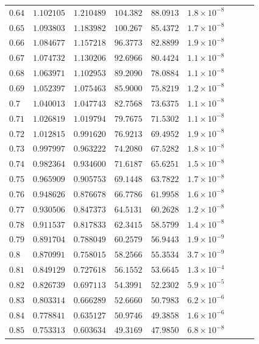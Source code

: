 \documentclass[12pt]{extarticle}
\theoremstyle{plain}
\theoremstyle{remark}
\begin{document}
\begin{longtable}{lcccccccc}
$0.64$ & $1.102105$ & $1.210489$ & $104.382$ & $88.0913$ & $1.8\times10^{-8}$ \\
$0.65$ & $1.093803$ & $1.183982$ & $100.267$ & $85.4372$ & $1.7\times10^{-8}$ \\
$0.66$ & $1.084677$ & $1.157218$ & $96.3773$ & $82.8899$ & $1.9\times10^{-8}$ \\
$0.67$ & $1.074732$ & $1.130206$ & $92.6966$ & $80.4424$ & $1.1\times10^{-8}$ \\
$0.68$ & $1.063971$ & $1.102953$ & $89.2090$ & $78.0884$ & $1.1\times10^{-8}$ \\
$0.69$ & $1.052397$ & $1.075463$ & $85.9000$ & $75.8219$ & $1.2\times10^{-8}$ \\
$0.7$ & $1.040013$ & $1.047743$ & $82.7568$ & $73.6375$ & $1.1\times10^{-8}$ \\
$0.71$ & $1.026819$ & $1.019794$ & $79.7675$ & $71.5302$ & $1.1\times10^{-8}$ \\
$0.72$ & $1.012815$ & $0.991620$ & $76.9213$ & $69.4952$ & $1.9\times10^{-8}$ \\
$0.73$ & $0.997997$ & $0.963222$ & $74.2080$ & $67.5282$ & $1.8\times10^{-8}$ \\
$0.74$ & $0.982364$ & $0.934600$ & $71.6187$ & $65.6251$ & $1.5\times10^{-8}$ \\
$0.75$ & $0.965909$ & $0.905753$ & $69.1448$ & $63.7822$ & $1.7\times10^{-8}$ \\
$0.76$ & $0.948626$ & $0.876678$ & $66.7786$ & $61.9958$ & $1.6\times10^{-8}$ \\
$0.77$ & $0.930506$ & $0.847373$ & $64.5131$ & $60.2628$ & $1.2\times10^{-8}$ \\
$0.78$ & $0.911537$ & $0.817833$ & $62.3415$ & $58.5799$ & $1.4\times10^{-8}$ \\
$0.79$ & $0.891704$ & $0.788049$ & $60.2579$ & $56.9443$ & $1.9\times10^{-9}$ \\
$0.8$ & $0.870991$ & $0.758015$ & $58.2566$ & $55.3534$ & $3.7\times10^{-9}$ \\
$0.81$ & $0.849129$ & $0.727618$ & $56.1552$ & $53.6645$ & $1.3\times10^{-4}$ \\
$0.82$ & $0.826739$ & $0.697113$ & $54.3991$ & $52.2302$ & $5.9\times10^{-5}$ \\
$0.83$ & $0.803314$ & $0.666289$ & $52.6660$ & $50.7983$ & $6.2\times10^{-6}$ \\
$0.84$ & $0.778841$ & $0.635127$ & $50.9746$ & $49.3858$ & $1.6\times10^{-6}$ \\
$0.85$ & $0.753313$ & $0.603634$ & $49.3169$ & $47.9850$ & $6.8\times10^{-8}$ \\

\end{longtable}
\end{document}
